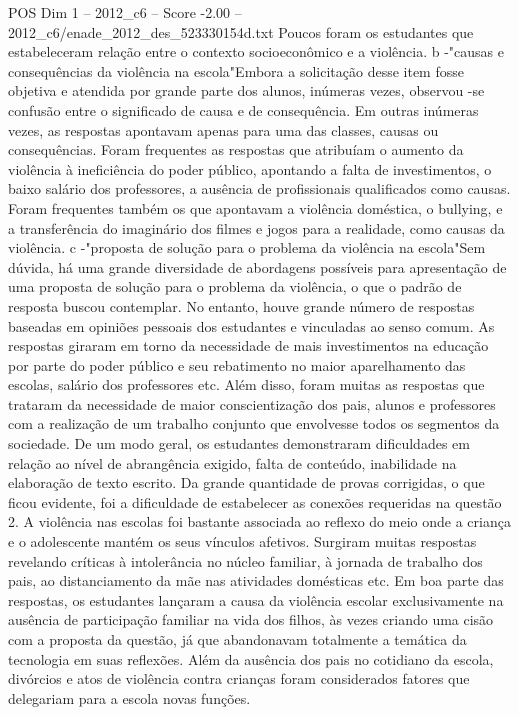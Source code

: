 \begin{textsample}{POS Dim 1 – 2012\_c6 – Score -2.00 – 2012\_c6/enade\_2012\_des\_523330154d.txt}
Poucos foram os estudantes que estabeleceram relação entre o contexto socioeconômico e a violência. b -"causas e consequências da violência na escola"Embora a solicitação desse item fosse objetiva e atendida por grande parte dos alunos, inúmeras vezes, observou -se confusão entre o significado de causa e de consequência.
Em outras inúmeras vezes, as respostas apontavam apenas para uma das classes, causas ou consequências.
Foram frequentes as respostas que atribuíam o aumento da violência à ineficiência do poder público, apontando a falta de investimentos, o baixo salário dos professores, a ausência de profissionais qualificados como causas.
Foram frequentes também os que apontavam a violência doméstica, o bullying, e a transferência do imaginário dos filmes e jogos para a realidade, como causas da violência. c -"proposta de solução para o problema da violência na escola"Sem dúvida, há uma grande diversidade de abordagens possíveis para apresentação de uma proposta de solução para o problema da violência, o que o padrão de resposta buscou contemplar.
No entanto, houve grande número de respostas baseadas em opiniões pessoais dos estudantes e vinculadas ao senso comum.
As respostas giraram em torno da necessidade de mais investimentos na educação por parte do poder público e seu rebatimento no maior aparelhamento das escolas, salário dos professores etc.
Além disso, foram muitas as respostas que trataram da necessidade de maior conscientização dos pais, alunos e professores com a realização de um trabalho conjunto que envolvesse todos os segmentos da sociedade.
De um modo geral, os estudantes demonstraram dificuldades em relação ao nível de abrangência exigido, falta de conteúdo, inabilidade na elaboração de texto escrito.
Da grande quantidade de provas corrigidas, o que ficou evidente, foi a dificuldade de estabelecer as conexões requeridas na questão 2.
A violência nas escolas foi bastante associada ao reflexo do meio onde a criança e o adolescente mantém os seus vínculos afetivos.
Surgiram muitas respostas revelando críticas à intolerância no núcleo familiar, à jornada de trabalho dos pais, ao distanciamento da mãe nas atividades domésticas etc.
Em boa parte das respostas, os estudantes lançaram a causa da violência escolar exclusivamente na ausência de participação familiar na vida dos filhos, às vezes criando uma cisão com a proposta da questão, já que abandonavam totalmente a temática da tecnologia em suas reflexões.
Além da ausência dos pais no cotidiano da escola, divórcios e atos de violência contra crianças foram considerados fatores que delegariam para a escola novas funções.

\end{textsample}
